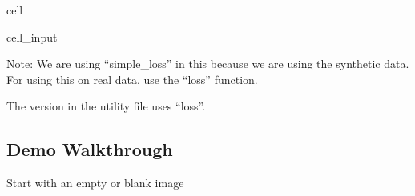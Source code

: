 \documentclass[letterpaper,10pt,english]{jupyterBook}
\begin{document}
\begin{sphinxuseclass}{cell}
\begin{sphinxVerbatimInput}
\begin{sphinxuseclass}{cell_input}
\begin{sphinxVerbatim}[commandchars=\\\{\}]
                \PYG{p}{[}\PYG{p}{]}      
                \PYG{p}{[}\PYG{p}{]}  \PYG{p}{[}\PYG{p}{]}
         
     
\end{sphinxVerbatim}

\end{sphinxuseclass}\end{sphinxVerbatimInput}

\end{sphinxuseclass}
\sphinxAtStartPar
Note: We are using “simple\_loss” in this because we are using the synthetic data. For using this on real data, use the “loss” function.

\sphinxAtStartPar
The version in the utility file uses “loss”.


\subsection{Demo Walkthrough}
\label{\detokenize{finite_gradient:demo-walkthrough}}
\sphinxAtStartPar
Start with an empty or blank image
\end{document}
